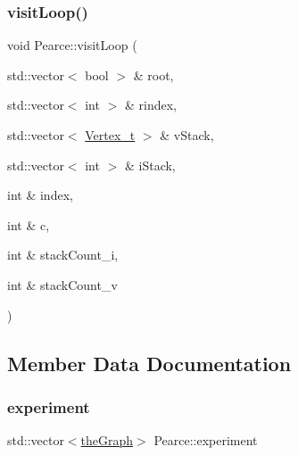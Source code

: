 \mbox{\label{class_pearce_a323fc3337d5849680065986d6ef7163c_a323fc3337d5849680065986d6ef7163c}} 
\subsubsection{\texorpdfstring{visit\+Loop()}{visitLoop()}}
{\footnotesize\ttfamily void Pearce\+::visit\+Loop (\begin{DoxyParamCaption}\item[{std\+::vector$<$ bool $>$ \&}]{root,  }\item[{std\+::vector$<$ int $>$ \&}]{rindex,  }\item[{std\+::vector$<$ \hyperlink{class_graph_component_ae67114a6ce5a001dc35e1996e1b45aa0_ae67114a6ce5a001dc35e1996e1b45aa0}{Vertex\+\_\+t} $>$ \&}]{v\+Stack,  }\item[{std\+::vector$<$ int $>$ \&}]{i\+Stack,  }\item[{int \&}]{index,  }\item[{int \&}]{c,  }\item[{int \&}]{stack\+Count\+\_\+i,  }\item[{int \&}]{stack\+Count\+\_\+v }\end{DoxyParamCaption})}



\subsection{Member Data Documentation}
\mbox{\label{class_pearce_ad33eb33876fe817143afb84583934313_ad33eb33876fe817143afb84583934313}} 
\subsubsection{\texorpdfstring{experiment}{experiment}}
{\footnotesize\ttfamily std\+::vector$<$\hyperlink{class_graph_component_a982e0748a6e1b8dc74986f5f8b3dca5c_a982e0748a6e1b8dc74986f5f8b3dca5c}{the\+Graph}$>$ Pearce\+::experiment}

\mbox{\label{class_pearce_a2320928312fd97f6bcb1f16684f79a03_a2320928312fd97f6bcb1f16684f79a03}} 
